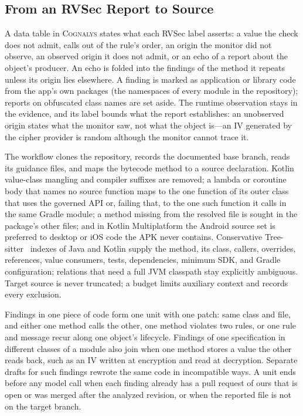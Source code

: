 \documentclass[conference]{IEEEtran}
\newcommand{\system}{\textsc{Cognalys}}
\begin{document}
\subsection{From an RVSec Report to Source}

A data table in \system{} states what each RVSec label asserts: a value the
check does not admit, calls out of the rule's order, an origin the monitor did
not observe, an observed origin it does not admit, or an echo of a report about
the object's producer. An echo is folded into the findings of the method it
repeats unless its origin lies elsewhere. A finding is marked as application or
library code from the app's own packages (the namespaces of every module in the
repository); reports on obfuscated class names are set aside. The runtime observation
stays in the evidence, and its label bounds what the report establishes: an
unobserved origin states what the monitor saw, not what the object is---an IV
generated by the cipher provider is random although the monitor cannot trace
it.

The workflow clones the repository, records the documented base branch, reads
its guidance files, and maps the bytecode method to a source declaration.
Kotlin value-class mangling and compiler suffixes are removed; a lambda or
coroutine body that names no source function maps to the one function of its
outer class that uses the governed API or, failing that, to the one such
function it calls in the same Gradle module; a method missing from the resolved
file is sought in the package's other files; and in Kotlin Multiplatform the
Android source set is preferred to desktop or iOS code the APK never contains.
Conservative Tree-sitter~\cite{treesitter} indexes of Java and Kotlin supply
the method, its class, callers, overrides, references, value consumers, tests,
dependencies, minimum SDK, and Gradle configuration; relations that need a full
JVM classpath stay explicitly ambiguous. Target source is never truncated; a budget limits
auxiliary context and records every exclusion.

Findings in one piece of code form one unit with one patch: same class and
file, and either one method calls the other, one method violates two rules, or
one rule and message recur along one object's lifecycle. Findings of one
specification in different classes of a module also join when one method
stores a value the other reads back, such as an IV written at encryption and
read at decryption. Separate drafts for such findings rewrote the same code in
incompatible ways. A unit ends before any model call when each finding already
has a pull request of ours that is open or was merged after the analyzed
revision, or when the reported file is not on the target branch.
\end{document}
